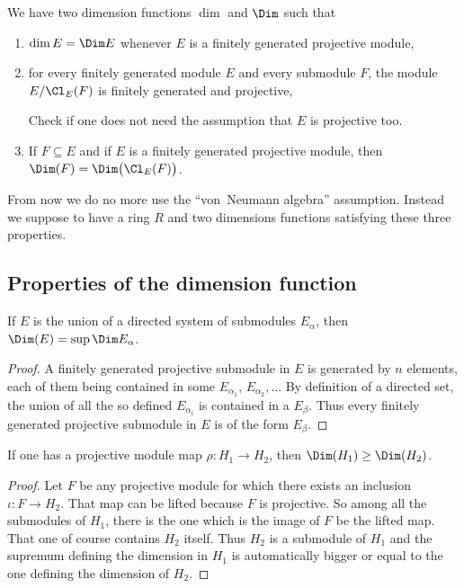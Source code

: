 We have two dimension functions $\dim$ and $\Dim$ such that
\begin{enumerate}
\item $\dim E=\Dim E$ whenever $E$ is a finitely generated projective module,
\item for every finitely generated module $E$ and every submodule $F$, the module $E/\Cl_E(F)$ is finitely generated and projective,
\begin{probleme}
Check if one does not need the assumption that $E$ is projective too.
\end{probleme}
\item If $F\subseteq E$ and if $E$ is a finitely generated projective module, then $\Dim(F)=\Dim\big( \Cl_E(F) \big)$.
\end{enumerate}
From now we do no more use the ``von~Neumann algebra'' assumption. Instead we suppose to have a ring $R$ and two dimensions functions satisfying these three properties.

					\subsection{Properties of the dimension function}

\begin{proposition}
If $E$ is the union of a directed system of submodules $E_{\alpha}$, then $\Dim(E)=\sup \Dim E_{\alpha}$.
\end{proposition}

\begin{proof}
A finitely generated projective submodule in $E$ is generated by $n$ elements, each of them being contained in some $E_{\alpha_1}$, $E_{\alpha_2},\ldots$ By definition of a directed set, the union of all the so defined $E_{\alpha_i}$ is contained in a $E_{\beta}$. Thus every finitely generated projective submodule in $E$ is of the form $E_{\beta}$.
\end{proof}

\begin{lemma}			\label{LemHinjectifHdimdim}
If one has a projective module map $\rho\colon H_1\to H_2$, then $\Dim(H_1)\geq\Dim(H_2)$.
\end{lemma}

\begin{proof}
Let $F$ be any projective module for which there exists an inclusion $\iota\colon F\to H_2$. That map can be lifted because $F$ is projective. So among all the submodules of $H_1$, there is the one which is the image of $F$ be the lifted map. That one of course contains $H_2$ itself. Thus $H_2$ is a submodule of $H_1$ and the supremum defining the dimension in $H_1$ is automatically bigger or equal to the one defining the dimension of $H_2$.
\end{proof}

